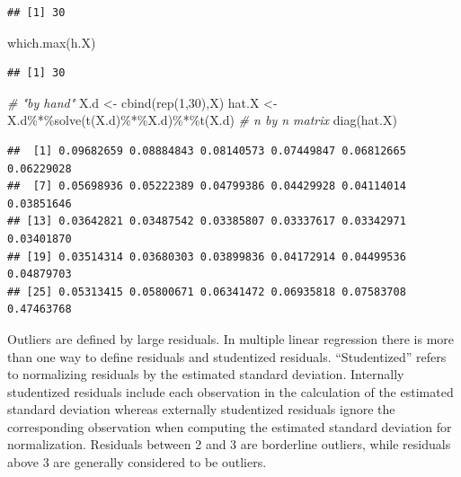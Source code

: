 \documentclass[
]{book}
\newenvironment{Shaded}{\begin{snugshade}}{\end{snugshade}}
\newcommand{\CommentTok}[1]{\textcolor[rgb]{0.56,0.35,0.01}{\textit{#1}}}
\newcommand{\DecValTok}[1]{\textcolor[rgb]{0.00,0.00,0.81}{#1}}
\newcommand{\FunctionTok}[1]{\textcolor[rgb]{0.00,0.00,0.00}{#1}}
\newcommand{\NormalTok}[1]{#1}
\newcommand{\OtherTok}[1]{\textcolor[rgb]{0.56,0.35,0.01}{#1}}
\newcommand{\SpecialCharTok}[1]{\textcolor[rgb]{0.00,0.00,0.00}{#1}}
\begin{document}
\begin{verbatim}
## [1] 30
\end{verbatim}

\begin{Shaded}
\begin{Highlighting}[]
\FunctionTok{which.max}\NormalTok{(h.X)}
\end{Highlighting}
\end{Shaded}

\begin{verbatim}
## [1] 30
\end{verbatim}

\begin{Shaded}
\begin{Highlighting}[]
\CommentTok{\# "by hand"}
\NormalTok{X.d }\OtherTok{\textless{}{-}} \FunctionTok{cbind}\NormalTok{(}\FunctionTok{rep}\NormalTok{(}\DecValTok{1}\NormalTok{,}\DecValTok{30}\NormalTok{),X)}
\NormalTok{hat.X }\OtherTok{\textless{}{-}}\NormalTok{ X.d}\SpecialCharTok{\%*\%}\FunctionTok{solve}\NormalTok{(}\FunctionTok{t}\NormalTok{(X.d)}\SpecialCharTok{\%*\%}\NormalTok{X.d)}\SpecialCharTok{\%*\%}\FunctionTok{t}\NormalTok{(X.d)  }\CommentTok{\# n by n matrix}
\FunctionTok{diag}\NormalTok{(hat.X)}
\end{Highlighting}
\end{Shaded}

\begin{verbatim}
##  [1] 0.09682659 0.08884843 0.08140573 0.07449847 0.06812665 0.06229028
##  [7] 0.05698936 0.05222389 0.04799386 0.04429928 0.04114014 0.03851646
## [13] 0.03642821 0.03487542 0.03385807 0.03337617 0.03342971 0.03401870
## [19] 0.03514314 0.03680303 0.03899836 0.04172914 0.04499536 0.04879703
## [25] 0.05313415 0.05800671 0.06341472 0.06935818 0.07583708 0.47463768
\end{verbatim}

Outliers are defined by large residuals. In multiple linear regression there is more than one way to define residuals and studentized residuals. ``Studentized'' refers to normalizing residuals by the estimated standard deviation. Internally studentized residuals include each observation in the calculation of the estimated standard deviation whereas externally studentized residuals ignore the corresponding observation when computing the estimated standard deviation for normalization. Residuals between 2 and 3 are borderline outliers, while residuals above 3 are generally considered to be outliers.

\begin{Shaded}
\end{Shaded}
\end{document}
